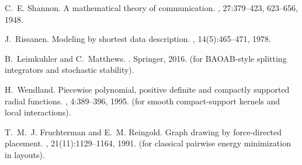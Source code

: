 \documentclass[11pt,a4paper]{article}
\numberwithin{equation}{section}
\begin{document}

\begin{thebibliography}{10}

C.~E. Shannon.
\newblock A mathematical theory of communication.
, 27:379--423, 623--656, 1948.

J.~Rissanen.
\newblock Modeling by shortest data description.
, 14(5):465--471, 1978.

B.~Leimkuhler and C.~Matthews.
.
\newblock Springer, 2016.
\newblock (for BAOAB-style splitting integrators and stochastic stability).

H.~Wendland.
\newblock Piecewise polynomial, positive definite and compactly supported
  radial functions.
, 4:389--396, 1995.
\newblock (for smooth compact-support kernels and local interactions).

T.~M.~J. Fruchterman and E.~M. Reingold.
\newblock Graph drawing by force-directed placement.
, 21(11):1129--1164, 1991.
\newblock (for classical pairwise energy minimization in layouts).

\end{thebibliography}
\end{document}
